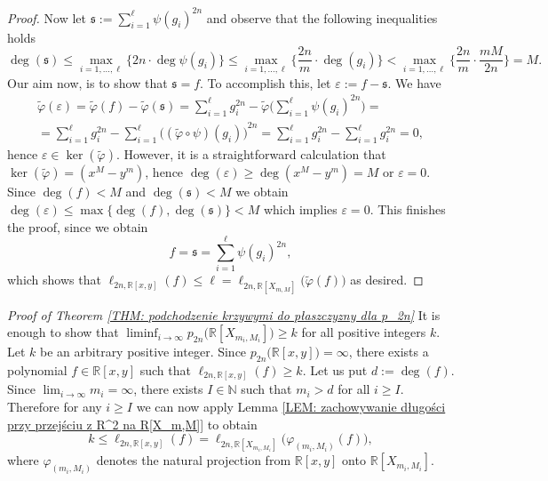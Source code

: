 \documentclass[12pt,reqno]{amsart}   	%
\theoremstyle{remark}
\newcommand{\R}{\mathbb{R}}
\newcommand{\N}{\mathbb{N}}
\begin{document}
\begin{proof}
    
    Now let $\mathfrak{s} := \sum_{i=1}^{\ell} {\psi(g_i)}^{2n}$ and observe that the following inequalities holds
    $$
    \deg(\mathfrak{s}) \leq \max_{i =1,\dots,\ell} \Big\{ 
    2n \cdot \deg \psi(g_i) 
    \Big\} 
    \leq
    \max_{i =1,\dots,\ell} \bigg\{ 
    \frac{2n}{m} \cdot \deg(g_i) 
    \bigg\}
    <
    \max_{i =1,\dots,\ell} \bigg\{ 
    \frac{2n}{m} \cdot \frac{mM}{2n} 
    \bigg\} = M.
    $$
    Our aim now, is to show that $\mathfrak{s} = f$. To accomplish this, let $\varepsilon := f -\mathfrak{s}$. We have
    \begin{multline*}
    \widetilde{\varphi} (\varepsilon) = \widetilde{\varphi}(f) - \widetilde{\varphi}(\mathfrak{s}) = 
    \sum_{i=1}^\ell g_i^{2n} - 
    \widetilde{\varphi}
    \Bigg(
    \sum_{i=1}^{\ell} {\psi(g_i)}^{2n}
    \Bigg)
    =
    \\
    =
    \sum_{i=1}^\ell g_i^{2n} - 
    \sum_{i=1}^{\ell} 
    {
    \Big(
    (\widetilde{\varphi} \circ \psi)(g_i)
    \Big)}^{2n} = 
    \sum_{i=1}^\ell g_i^{2n} - \sum_{i=1}^\ell g_i^{2n} = 0,
    \end{multline*}
    hence $\varepsilon \in \ker (\widetilde{\varphi})$. However, it is a straightforward calculation that $\ker (\widetilde{\varphi}) = (x^M - y^m)$, hence $\deg(\varepsilon) \geq \deg(x^M - y^m) = M$ or $\varepsilon = 0$. Since $\deg(f) < M$ and $\deg(\mathfrak{s}) < M$ we obtain $\deg(\varepsilon) \leq \max \big\{ \deg(f), \deg(\mathfrak{s}) \big\} < M$ which implies $\varepsilon = 0$. This finishes the proof, since we obtain
    $$
    f = \mathfrak{s} = \sum_{i=1}^{\ell} {\psi(g_i)}^{2n},
    $$
    which shows that $\ell_{2n,\R[x,y]}(f) \leq \ell = \ell_{2n,\R[X_{m,M}]}
    \big(
    \widetilde{\varphi}(f)
    \big)$ as desired.
\end{proof}

\noindent
\textit{Proof of Theorem \ref{THM: podchodzenie krzywymi do płaszczyzny dla p_2n}}
It is enough to show that 
$
    \liminf_{i \rightarrow \infty} p_{2n}
        \big(
        \R [X_{m_i,M_i}]
        \big)
    \geq k
$
for all positive integers $k$. Let $k$ be an arbitrary positive integer. Since $p_{2n}\big(\R[x,y]\big) = \infty$, there exists a polynomial $f \in \R[x,y]$ such that $\ell_{2n, \R[x,y]}(f) \geq k$. Let us put $d := \deg(f)$. Since $\lim_{i \rightarrow \infty} m_i = \infty$, there exists $I \in \N$ such that $m_i > d$ for all $i \geq I$. Therefore for any $i \geq I$ we can now apply Lemma \ref{LEM: zachowywanie długości przy przejściu z R^2 na R[X_m,M]} to obtain 
$$
   k \leq \ell_{2n, \R[x,y]} (f) = \ell_{2n,\R[X_{m_i,M_i}]}\big(\varphi_{(m_i,M_i)}(f)\big),
$$
where $\varphi_{(m_i,M_i)}$ denotes the natural projection from $\R[x,y]$ onto $\R[X_{m_i,M_i}]$.
\end{document}
